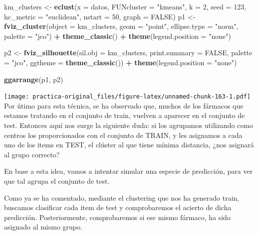 \documentclass[spanish,]{article}
\newenvironment{Shaded}{\begin{snugshade}}{\end{snugshade}}
\newcommand{\KeywordTok}[1]{\textcolor[rgb]{0.13,0.29,0.53}{\textbf{#1}}}
\newcommand{\DataTypeTok}[1]{\textcolor[rgb]{0.13,0.29,0.53}{#1}}
\newcommand{\DecValTok}[1]{\textcolor[rgb]{0.00,0.00,0.81}{#1}}
\newcommand{\StringTok}[1]{\textcolor[rgb]{0.31,0.60,0.02}{#1}}
\newcommand{\OtherTok}[1]{\textcolor[rgb]{0.56,0.35,0.01}{#1}}
\newcommand{\OperatorTok}[1]{\textcolor[rgb]{0.81,0.36,0.00}{\textbf{#1}}}
\newcommand{\NormalTok}[1]{#1}
\begin{document}
\begin{Shaded}
\begin{Highlighting}[]
\NormalTok{km_clusters <-}\StringTok{ }\KeywordTok{eclust}\NormalTok{(}\DataTypeTok{x =}\NormalTok{ datos, }\DataTypeTok{FUNcluster =} \StringTok{"kmeans"}\NormalTok{, }\DataTypeTok{k =} \DecValTok{2}\NormalTok{, }\DataTypeTok{seed =} \DecValTok{123}\NormalTok{, }
                      \DataTypeTok{hc_metric =} \StringTok{"euclidean"}\NormalTok{, }\DataTypeTok{nstart =} \DecValTok{50}\NormalTok{, }\DataTypeTok{graph =} \OtherTok{FALSE}\NormalTok{)}
\NormalTok{p1 <-}\StringTok{ }\KeywordTok{fviz_cluster}\NormalTok{(}\DataTypeTok{object =}\NormalTok{ km_clusters, }\DataTypeTok{geom =} \StringTok{"point"}\NormalTok{, }\DataTypeTok{ellipse.type  =} \StringTok{"norm"}\NormalTok{,}
                   \DataTypeTok{palette =} \StringTok{"jco"}\NormalTok{) }\OperatorTok{+}
\StringTok{      }\KeywordTok{theme_classic}\NormalTok{() }\OperatorTok{+}\StringTok{ }\KeywordTok{theme}\NormalTok{(}\DataTypeTok{legend.position =} \StringTok{"none"}\NormalTok{) }

\NormalTok{p2 <-}\StringTok{ }\KeywordTok{fviz_silhouette}\NormalTok{(}\DataTypeTok{sil.obj =}\NormalTok{ km_clusters, }\DataTypeTok{print.summary =} \OtherTok{FALSE}\NormalTok{,}
                      \DataTypeTok{palette =} \StringTok{"jco"}\NormalTok{, }\DataTypeTok{ggtheme =} \KeywordTok{theme_classic}\NormalTok{()) }\OperatorTok{+}
\StringTok{      }\KeywordTok{theme}\NormalTok{(}\DataTypeTok{legend.position =} \StringTok{"none"}\NormalTok{)}

\KeywordTok{ggarrange}\NormalTok{(p1, p2)}
\end{Highlighting}
\end{Shaded}

\texttt{[image: practica-original\_files/figure-latex/unnamed-chunk-163-1.pdf]}
Por útimo para esta técnica, se ha observado que, muchos de los fármacos
que estamos tratando en el conjunto de train, vuelven a aparecer en el
conjunto de test. Entonces aquí nos surge la siguiente duda: si los
agrupamos utilizando como centros los proporcionados con el conjunto de
TRAIN, y les asignamos a cada uno de los items en TEST, el clúster al
que tiene mínima distancia, ¿nos asignará al grupo correcto?

En base a esta idea, vamos a intentar simular una especie de predicción,
para ver que tal agrupa el conjunto de test.

Como ya se ha comentado, mediante el clustering que nos ha generado
train, buscamos clasificar cada item de test y comprobaremos el acierto
de dicha predicción. Posteriormente, comprobaremos si ese mismo fármaco,
ha sido asignado al mismo grupo.
\end{document}
